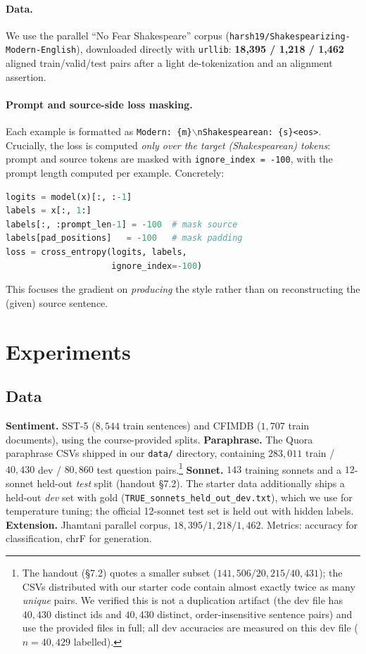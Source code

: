 \documentclass[10pt,twocolumn]{article}
\begin{document}
\paragraph{Data.} We use the parallel ``No Fear Shakespeare'' corpus
\cite{jhamtani2017shakespearizing} (\texttt{harsh19/Shakespearizing-Modern-English}),
downloaded directly with \texttt{urllib}: \textbf{18{,}395 / 1{,}218 / 1{,}462}
aligned train/valid/test pairs after a light de-tokenization and an alignment
assertion.

\paragraph{Prompt and source-side loss masking.} Each example is formatted as
\texttt{Modern: \{m\}$\backslash$nShakespearean: \{s\}<eos>}. Crucially, the loss
is computed \emph{only over the target (Shakespearean) tokens}: prompt and
source tokens are masked with \texttt{ignore\_index = -100}, with the prompt
length computed per example. Concretely:
\begin{lstlisting}[language=Python]
logits = model(x)[:, :-1]
labels = x[:, 1:]
labels[:, :prompt_len-1] = -100  # mask source
labels[pad_positions]   = -100   # mask padding
loss = cross_entropy(logits, labels,
                     ignore_index=-100)
\end{lstlisting}
This focuses the gradient on \emph{producing} the style rather than on
reconstructing the (given) source sentence.

\section{Experiments}
\subsection{Data}
\textbf{Sentiment.} SST-5 ($8{,}544$ train sentences) and CFIMDB ($1{,}707$
train documents), using the course-provided splits. \textbf{Paraphrase.} The
Quora paraphrase CSVs shipped in our \texttt{data/} directory, containing
$283{,}011$ train / $40{,}430$ dev / $80{,}860$ test question
pairs.\footnote{\label{fn:quora}The handout (\S7.2) quotes a smaller subset
($141{,}506 / 20{,}215 / 40{,}431$); the CSVs distributed with our starter code
contain almost exactly twice as many \emph{unique} pairs. We verified this is not
a duplication artifact (the dev file has $40{,}430$ distinct ids and $40{,}430$
distinct, order-insensitive sentence pairs) and use the provided files in full;
all dev accuracies are measured on this dev file ($n{=}40{,}429$ labelled).}
\textbf{Sonnet.} $143$ training sonnets and a $12$-sonnet held-out \emph{test}
split (handout \S7.2). The starter data additionally ships a held-out
\emph{dev} set with gold (\texttt{TRUE\_sonnets\_held\_out\_dev.txt}), which we
use for temperature tuning; the official 12-sonnet test set is held out with
hidden labels. \textbf{Extension.} Jhamtani parallel corpus,
$18{,}395 / 1{,}218 / 1{,}462$. Metrics: accuracy for classification, chrF for
generation.
\end{document}
